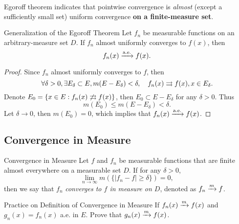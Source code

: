 \begin{note}
  Egoroff theorem indicates that pointwise convergence is
  \emph{almost} (except a sufficiently small set) uniform convergence
  \textbf{on a finite-measure set}.
\end{note}

\begin{example}{Generalization of the Egoroff Theorem}{}
  Let $f_n$ be measurable functions on an arbitrary-measure set $D$.
  If $f_n$ almost uniformly converges to $f(x)$, then
  \begin{equation}
    f_n(x) \xrightarrow{\text{a.e.}} f(x).
  \end{equation}
\end{example}

\begin{proof}
  Since $f_n$ almost uniformly converges to $f$, then
  \begin{equation}
    \forall \delta > 0, \exists E_{\delta} \subset E, m(E - E_{\delta}) < \delta,
    \quad f_n(x) \rightrightarrows f(x), x \in E_{\delta}.
  \end{equation}
  Denote $E_0 = \{x \in E: f_n(x) \not \rightrightarrows f(x)\}$, then $E_0 \subset E - E_{\delta}$ for any $\delta > 0$.
  Thus
  \begin{equation}
    m(E_0) \leq m(E - E_{\delta}) < \delta.
  \end{equation}
  Let $\delta \rightarrow 0$, then $m(E_0) = 0$, which implies that $f_n(x) \xrightarrow{\text{a.e.}} f(x)$.
\end{proof}

\subsection{Convergence in Measure}

\begin{definition}{Convergence in Measure}{}
  Let $f$ and $f_n$ be measurable functions that are finite almost everywhere on
  a measurable set $D$. If for any $\delta > 0$,
  \begin{equation}
    \lim \limits _{n \rightarrow \infty} m(\{|f_n - f| \geq \delta\}) = 0,
  \end{equation}
  then we say that $f_n$ \emph{converges to $f$ in measure on $D$},
  denoted as $f_n \xrightarrow{m} f$.
\end{definition}

\begin{example}{Practice on Definition of Convergence in Measure}{}
  If $f_n(x) \xrightarrow{m} f(x)$ and $g_n(x) = f_n(x)$ a.e. in $E$.
  Prove that $g_n(x) \xrightarrow{m} f(x)$.
\end{example}

